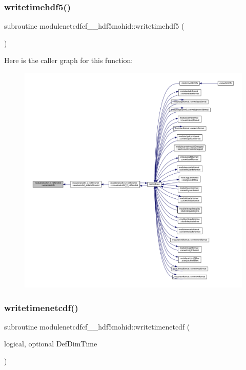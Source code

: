 \subsubsection{\texorpdfstring{writetimehdf5()}{writetimehdf5()}}
{\footnotesize\ttfamily subroutine modulenetcdfcf\+\_\+\_\+hdf5mohid\+::writetimehdf5 (\begin{DoxyParamCaption}{ }\end{DoxyParamCaption})\hspace{0.3cm}{\ttfamily [private]}}

Here is the caller graph for this function\+:\nopagebreak
\begin{figure}[H]
\begin{center}
\leavevmode
\includegraphics[width=350pt]{namespacemodulenetcdfcf__2__hdf5mohid_ac7924022182350a5df92f593c9dd7c76_icgraph}
\end{center}
\end{figure}
\mbox{\label{namespacemodulenetcdfcf__2__hdf5mohid_a4a79edecc3020a71ece2ef3223da1024}} 
\subsubsection{\texorpdfstring{writetimenetcdf()}{writetimenetcdf()}}
{\footnotesize\ttfamily subroutine modulenetcdfcf\+\_\+\_\+hdf5mohid\+::writetimenetcdf (\begin{DoxyParamCaption}\item[{logical, optional}]{Def\+Dim\+Time }\end{DoxyParamCaption})\hspace{0.3cm}{\ttfamily [private]}}

